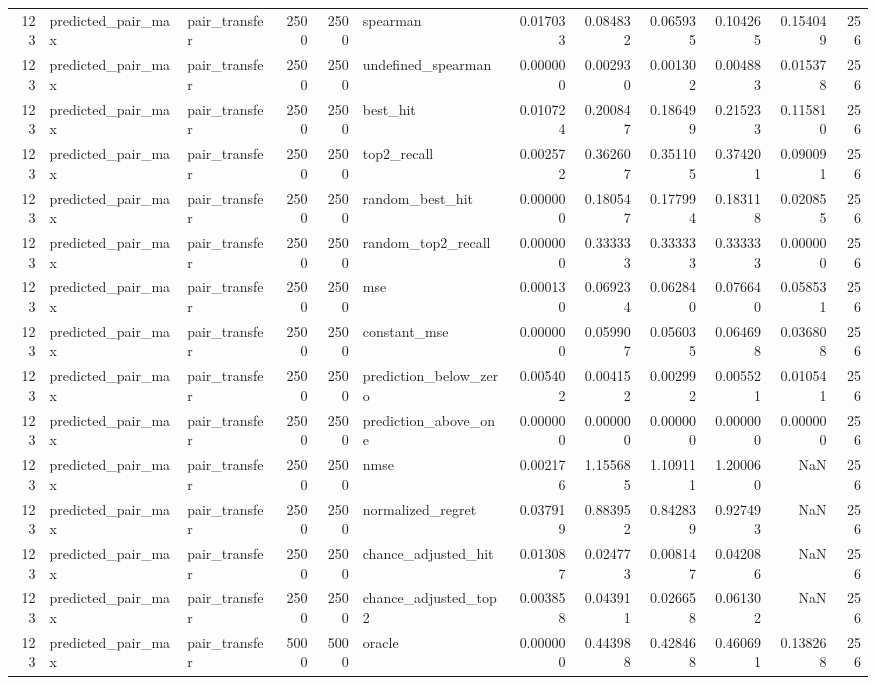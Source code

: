 \begin{tabular}{rllrrlrrrrrr}
123 & predicted_pair_max & pair_transfer & 2500 & 2500 & spearman & 0.017033 & 0.084832 & 0.065935 & 0.104265 & 0.154049 & 256 \\
123 & predicted_pair_max & pair_transfer & 2500 & 2500 & undefined_spearman & 0.000000 & 0.002930 & 0.001302 & 0.004883 & 0.015378 & 256 \\
123 & predicted_pair_max & pair_transfer & 2500 & 2500 & best_hit & 0.010724 & 0.200847 & 0.186499 & 0.215233 & 0.115810 & 256 \\
123 & predicted_pair_max & pair_transfer & 2500 & 2500 & top2_recall & 0.002572 & 0.362607 & 0.351105 & 0.374201 & 0.090091 & 256 \\
123 & predicted_pair_max & pair_transfer & 2500 & 2500 & random_best_hit & 0.000000 & 0.180547 & 0.177994 & 0.183118 & 0.020855 & 256 \\
123 & predicted_pair_max & pair_transfer & 2500 & 2500 & random_top2_recall & 0.000000 & 0.333333 & 0.333333 & 0.333333 & 0.000000 & 256 \\
123 & predicted_pair_max & pair_transfer & 2500 & 2500 & mse & 0.000130 & 0.069234 & 0.062840 & 0.076640 & 0.058531 & 256 \\
123 & predicted_pair_max & pair_transfer & 2500 & 2500 & constant_mse & 0.000000 & 0.059907 & 0.056035 & 0.064698 & 0.036808 & 256 \\
123 & predicted_pair_max & pair_transfer & 2500 & 2500 & prediction_below_zero & 0.005402 & 0.004152 & 0.002992 & 0.005521 & 0.010541 & 256 \\
123 & predicted_pair_max & pair_transfer & 2500 & 2500 & prediction_above_one & 0.000000 & 0.000000 & 0.000000 & 0.000000 & 0.000000 & 256 \\
123 & predicted_pair_max & pair_transfer & 2500 & 2500 & nmse & 0.002176 & 1.155685 & 1.109111 & 1.200060 & NaN & 256 \\
123 & predicted_pair_max & pair_transfer & 2500 & 2500 & normalized_regret & 0.037919 & 0.883952 & 0.842839 & 0.927493 & NaN & 256 \\
123 & predicted_pair_max & pair_transfer & 2500 & 2500 & chance_adjusted_hit & 0.013087 & 0.024773 & 0.008147 & 0.042086 & NaN & 256 \\
123 & predicted_pair_max & pair_transfer & 2500 & 2500 & chance_adjusted_top2 & 0.003858 & 0.043911 & 0.026658 & 0.061302 & NaN & 256 \\
123 & predicted_pair_max & pair_transfer & 5000 & 5000 & oracle & 0.000000 & 0.443988 & 0.428468 & 0.460691 & 0.138268 & 256 \\

\end{tabular}
